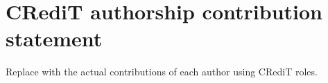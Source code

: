 \section*{CRediT authorship contribution statement}
Replace with the actual contributions of each author using CRediT roles.

